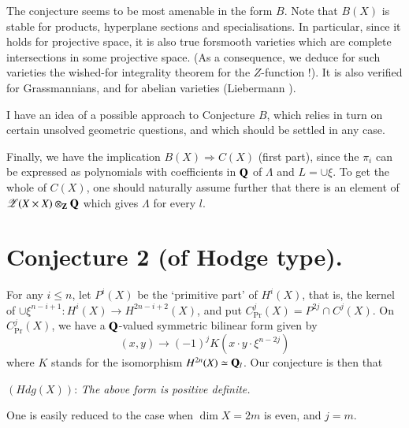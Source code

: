 The conjecture seems to be most amenable in the form $B$. Note that $B(X)$ is stable for products, hyperplane sections and specialisations. In particular, since it holds for projective space, it is also true for\pageoriginale smooth varieties which are complete intersections in some projective space. (As a consequence, we deduce for such varieties the wished-for integrality theorem for the $Z$-function !). It is also verified for Grassmannians, and for abelian varieties (Liebermann \cite{art09-key3}).

I have an idea of a possible approach to Conjecture $B$, which relies in turn on certain unsolved geometric questions, and which should be settled in any case.

Finally, we have the implication $B(X)\Rightarrow C(X)$ (first part), since the $\pi_{i}$ can be expressed as polynomials with coefficients in $\mathbf{Q}$ of $\Lambda$ and $L=\cup \xi$. To get the whole of $C(X)$, one should naturally assume further that there is an element of $\mathscr{Z}(X\times X)\otimes_{\mathbf{Z}}\mathbf{Q}$ which gives $\Lambda$ for every $l$.

\section{Conjecture 2 (of Hodge type).}\label{art09-sec4}

For any $i\leq n$, let $P^{i}(X)$ be the `primitive part' of $H^{i}(X)$, that is, the kernel of $\cup \xi^{n-i+1}:H^{i}(X)\to H^{2n-i+2}(X)$, and put $C^{j}_{\Pr}(X)=P^{2j}\cap C^{j}(X)$. On $C^{j}_{\Pr}(X)$, we have a $\mathbf{Q}$-valued symmetric bilinear form given by
$$
(x,y)\to (-1)^{j}K(x\cdot y\cdot \xi^{n-2j})
$$
where $K$ stands for the isomorphism $H^{2n}(X)\simeq \mathbf{Q}_{l}$. Our conjecture is then that

$(Hdg(X))$: {\em The above form is positive definite.}

One is easily reduced to the case when $\dim X=2m$ is even, and $j=m$.

